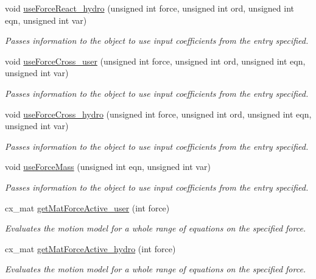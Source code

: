 \begin{DoxyCompactItemize}
void \hyperlink{class_motion_model_ae3d2c7527ea2daddc6a85b6e02febb45}{use\-Force\-React\-\_\-hydro} (unsigned int force, unsigned int ord, unsigned int eqn, unsigned int var)
\begin{DoxyCompactList}\small\item\em Passes information to the object to use input coefficients from the entry specified. \end{DoxyCompactList}\item 
void \hyperlink{class_motion_model_a1159117995080d2b62e50fceaeb29778}{use\-Force\-Cross\-\_\-user} (unsigned int force, unsigned int ord, unsigned int eqn, unsigned int var)
\begin{DoxyCompactList}\small\item\em Passes information to the object to use input coefficients from the entry specified. \end{DoxyCompactList}\item 
void \hyperlink{class_motion_model_abfd6e4a22ec23d7ee462adb737fab3f2}{use\-Force\-Cross\-\_\-hydro} (unsigned int force, unsigned int ord, unsigned int eqn, unsigned int var)
\begin{DoxyCompactList}\small\item\em Passes information to the object to use input coefficients from the entry specified. \end{DoxyCompactList}\item 
void \hyperlink{class_motion_model_aecaf9f0261355cff2acf602acd728644}{use\-Force\-Mass} (unsigned int eqn, unsigned int var)
\begin{DoxyCompactList}\small\item\em Passes information to the object to use input coefficients from the entry specified. \end{DoxyCompactList}\item 
cx\-\_\-mat \hyperlink{class_motion_model_af9d30b6afa16093429fab496d18c5d00}{get\-Mat\-Force\-Active\-\_\-user} (int force)
\begin{DoxyCompactList}\small\item\em Evaluates the motion model for a whole range of equations on the specified force. \end{DoxyCompactList}\item 
cx\-\_\-mat \hyperlink{class_motion_model_a56059a3d7f37c9dad5f906714ba159de}{get\-Mat\-Force\-Active\-\_\-hydro} (int force)
\begin{DoxyCompactList}\small\item\em Evaluates the motion model for a whole range of equations on the specified force. \end{DoxyCompactList}\item 

\end{DoxyCompactItemize}
